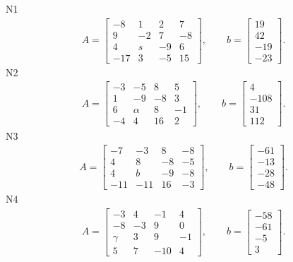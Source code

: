 \documentclass[11pt]{report}
\begin{document}
N1
\begin{align*}
 A = \left[\begin{matrix}-8 & 1 & 2 & 7\\9 & -2 & 7 & -8\\4 & s & -9 & 6\\-17 & 3 & -5 & 15\end{matrix}\right],
\qquad b = \left[\begin{matrix}19\\42\\-19\\-23\end{matrix}\right]. 
 \end{align*}
N2
\begin{align*}
 A = \left[\begin{matrix}-3 & -5 & 8 & 5\\1 & -9 & -8 & 3\\6 & \alpha & 8 & -1\\-4 & 4 & 16 & 2\end{matrix}\right],
\qquad b = \left[\begin{matrix}4\\-108\\31\\112\end{matrix}\right]. 
 \end{align*}
N3
\begin{align*}
 A = \left[\begin{matrix}-7 & -3 & 8 & -8\\4 & 8 & -8 & -5\\4 & b & -9 & -8\\-11 & -11 & 16 & -3\end{matrix}\right],
\qquad b = \left[\begin{matrix}-61\\-13\\-28\\-48\end{matrix}\right]. 
 \end{align*}
N4
\begin{align*}
 A = \left[\begin{matrix}-3 & 4 & -1 & 4\\-8 & -3 & 9 & 0\\\gamma & 3 & 9 & -1\\5 & 7 & -10 & 4\end{matrix}\right],
\qquad b = \left[\begin{matrix}-58\\-61\\-5\\3\end{matrix}\right]. 
 \end{align*}
\end{document}
